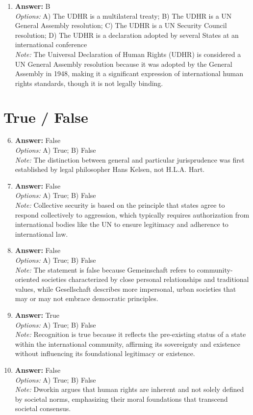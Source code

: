 \documentclass[12pt]{article}
\begin{document}
\begin{enumerate}[label=\arabic*.]
\item \textbf{Answer:} B
\\ \textit{Options:} A) The UDHR is a multilateral treaty; B) The UDHR is a UN General Assembly resolution; C) The UDHR is a UN Security Council resolution; D) The UDHR is a declaration adopted by several States at an international conference
\\ \textit{Note:} The Universal Declaration of Human Rights (UDHR) is considered a UN General Assembly resolution because it was adopted by the General Assembly in 1948, making it a significant expression of international human rights standards, though it is not legally binding.
\end{enumerate}

\section*{True / False}
\begin{enumerate}[label=\arabic*.]
\setcounter{enumi}{5}
\item \textbf{Answer:} False
\\ \textit{Options:} A) True; B) False
\\ \textit{Note:} The distinction between general and particular jurisprudence was first established by legal philosopher Hans Kelsen, not H.L.A. Hart.
\item \textbf{Answer:} False
\\ \textit{Options:} A) True; B) False
\\ \textit{Note:} Collective security is based on the principle that states agree to respond collectively to aggression, which typically requires authorization from international bodies like the UN to ensure legitimacy and adherence to international law.
\item \textbf{Answer:} False
\\ \textit{Options:} A) True; B) False
\\ \textit{Note:} The statement is false because Gemeinschaft refers to community-oriented societies characterized by close personal relationships and traditional values, while Gesellschaft describes more impersonal, urban societies that may or may not embrace democratic principles.
\item \textbf{Answer:} True
\\ \textit{Options:} A) True; B) False
\\ \textit{Note:} Recognition is true because it reflects the pre-existing status of a state within the international community, affirming its sovereignty and existence without influencing its foundational legitimacy or existence.
\item \textbf{Answer:} False
\\ \textit{Options:} A) True; B) False
\\ \textit{Note:} Dworkin argues that human rights are inherent and not solely defined by societal norms, emphasizing their moral foundations that transcend societal consensus.
\end{enumerate}
\end{document}
